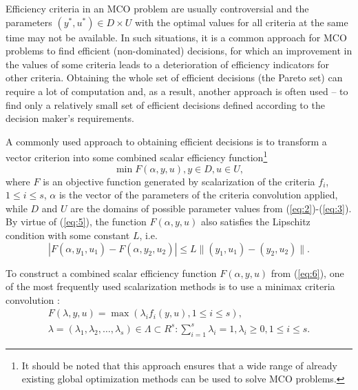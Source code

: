 \documentclass{svproc}
\begin{document}
Efficiency criteria in an MCO problem are usually controversial and the parameters $(y^*,u^*) \in D \times U$ with the optimal values for all criteria at the same time may not be available. In such situations, it is a common approach for MCO problems to find efficient (non-dominated) decisions, for which an improvement in the values of some criteria leads to a deterioration of efficiency indicators for other criteria. Obtaining the whole set of efficient decisions (the Pareto set) can require a lot of computation and, as a result, another approach is often used -- to find only a relatively small set of efficient decisions defined according to the decision maker's requirements.

A commonly used approach to obtaining efficient decisions is to transform a vector criterion into some combined scalar efficiency function\footnote{It should be noted that this approach ensures that a wide range of already existing global optimization methods can be used to solve MCO problems.}
\begin{equation}\label{eq:6}
  \min{F(\alpha,y,u)}, y \in D, u \in U,
\end{equation}
where $F$ is an objective function generated by scalarization of the criteria $f_i$, $1 \leq i \leq s$, $\alpha$ is the vector of the parameters of the criteria convolution applied, while $D$ and $U$ are the domains of possible parameter values from (\ref{eq:2})-(\ref{eq:3}). By virtue of (\ref{eq:5}), the function $F(\alpha, y, u)$ also satisfies the Lipschitz condition with some constant $L$, i.e.  
\begin{equation}\label{eq:7}
  |F(\alpha, y_1, u_1)-F(\alpha, y_2, u_2)| \leq L\|(y_1,u_1)-(y_2,u_2)\|.
\end{equation}

To construct a combined scalar efficiency function $F(\alpha,y,u)$ from (\ref{eq:6}), one of the most frequently used scalarization methods is to use a minimax criteria convolution \cite{c2,c5}:
\begin{equation}\label{eq:8}
\begin{matrix}
  F(\lambda,y,u)=\max{(\lambda_i f_i (y,u),1\leq i \leq s)},\\
  \lambda=(\lambda_1,\lambda_2, \dots, \lambda_s)\in \Lambda \subset R^s: \sum_{i=1}^{s}\lambda_i=1, \lambda_i \geq 0, 1 \leq i \leq s.
\end{matrix}
\end{equation}
\end{document}
